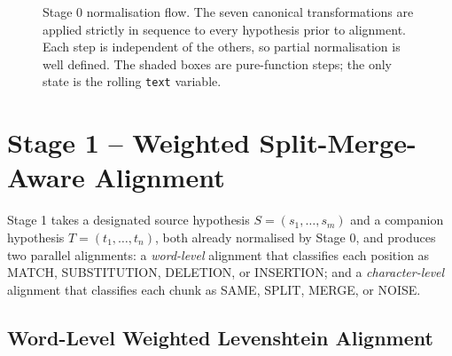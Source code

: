 \begin{figure}[H]
{}
    \caption[Stage 0 normalisation flow]{Stage 0 normalisation flow. The seven canonical transformations are applied strictly in sequence to every hypothesis prior to alignment. Each step is independent of the others, so partial normalisation is well defined. The shaded boxes are pure-function steps; the only state is the rolling \texttt{text} variable.}
    \label{fig:stage0-flow}
\end{figure}

\section{Stage 1 -- Weighted Split-Merge-Aware Alignment}
\label{sec:stage1}

Stage 1 takes a designated source hypothesis $S = (s_1, \ldots, s_m)$ and a companion hypothesis $T = (t_1, \ldots, t_n)$, both already normalised by Stage 0, and produces two parallel alignments: a \emph{word-level} alignment that classifies each position as MATCH, SUBSTITUTION, DELETION, or INSERTION; and a \emph{character-level} alignment that classifies each chunk as SAME, SPLIT, MERGE, or NOISE.

\subsection{Word-Level Weighted Levenshtein Alignment}
\label{ssec:weighted-lev}

